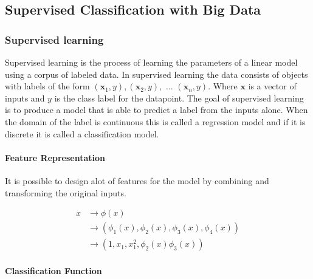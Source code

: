 \subsection{Supervised Classification with Big Data}


\subsubsection{Supervised learning}
Supervised learning is the process of learning the parameters of a linear model using a corpus of labeled data.
In supervised learning the data consists of objects with labels of the form 
$(\textbf{x}_1,y),(\textbf{x}_2,y), \text{ ... } (\textbf{x}_n,y)$.
Where $\textbf{x}$ is a vector of inputs and $y$ is the class label for the datapoint.
The goal of supervised learning is to produce a model that is able to predict a label from the inputs alone.
When the domain of the label is continuous this is called a regression model and if it is discrete it is called a classification model.

\paragraph{Feature Representation}\label{sec:phi}
It is possible to design alot of features for the model by combining and transforming the original inputs.

\begin{align*}
x &\rightarrow \phi(x) \\
&\rightarrow (\phi_1(x), \phi_2(x), \phi_3(x), \phi_4(x)) \\
&\rightarrow (1, x_1, x_1^2, \phi_2(x)\phi_3(x))
\end{align*} 

\paragraph{Classification Function}










 
